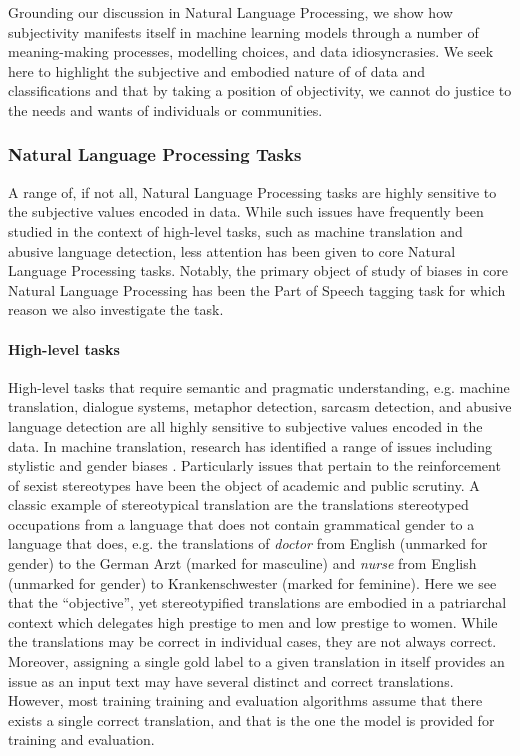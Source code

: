 Grounding our discussion in Natural Language Processing, we show how subjectivity manifests itself in machine learning models through a number of meaning-making processes, modelling choices, and data idiosyncrasies. We seek here to highlight the subjective and embodied nature of of data and classifications and that by taking a position of objectivity, we cannot do justice to the needs and wants of individuals or communities.

\subsubsection{Natural Language Processing Tasks}

A range of, if not all, Natural Language Processing tasks are highly sensitive to the subjective values encoded in data. While such issues have frequently been studied in the context of high-level tasks, such as machine translation and abusive language detection, less attention has been given to core Natural Language Processing tasks. Notably, the primary object of study of biases in core Natural Language Processing has been the Part of Speech tagging task \cite{Blodgett:2016,Jorgensen:2016} for which reason we also investigate the task.

\paragraph{High-level tasks} High-level tasks that require semantic and pragmatic understanding, e.g. machine translation, dialogue systems, metaphor detection, sarcasm detection, and abusive language detection are all highly sensitive to subjective values encoded in the data. In machine translation, research has identified a range of issues including stylistic \cite{Hovy:2020} and gender biases \cite{Vanmassenhove:2018}. Particularly issues that pertain to the reinforcement of sexist stereotypes have been the object of academic \cite{Escuda:2019} and public \cite{Locklear:2018} scrutiny. A classic example of stereotypical translation are the translations stereotyped occupations from a language that does not contain grammatical gender to a language that does, e.g. the translations of \textit{doctor} from English (unmarked for gender) to the German Arzt (marked for masculine) and \textit{nurse} from English (unmarked for gender) to Krankenschwester (marked for feminine). Here we see that the ``objective'', yet stereotypified translations are embodied in a patriarchal context which delegates high prestige to men and low prestige to women. While the translations may be correct in individual cases, they are not always correct. Moreover, assigning a single gold label to a given translation in itself provides an issue as an input text may have several distinct and correct translations. However, most training training and evaluation algorithms assume that there exists a single correct translation, and that is the one the model is provided for training and evaluation.

